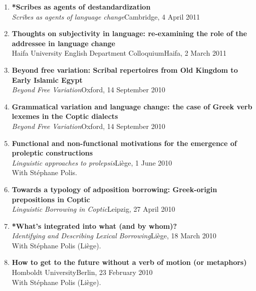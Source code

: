 \documentclass[letterpaper,11pt]{article}
\begin{document}
\begin{enumerate}[resume]
\item \textbf{*Scribes as agents of destandardization}\\\textit{Scribes as agents of language change}\hfill{Cambridge, 4 April 2011}\\

\item \textbf{Thoughts on subjectivity in language: re-examining the role of the addressee in language change}\\
Haifa University English Department Colloquium\hfill{Haifa, 2 March 2011}

\item \textbf{Beyond free variation: Scribal repertoires from Old Kingdom to Early Islamic Egypt}\\\textit{Beyond Free Variation}\hfill{Oxford, 14 September 2010}

\item \textbf{Grammatical variation and language change: the case of Greek verb lexemes in the Coptic dialects}\\
\textit{Beyond Free Variation}\hfill{Oxford, 14 September 2010}

\item \textbf{Functional and non-functional motivations for the emergence of proleptic constructions}\\\textit{Linguistic approaches to prolepsis}\hfill{Li\`{e}ge, 1 June 2010}\\With St\'{e}phane Polis. 


\item \textbf{Towards a typology of adposition borrowing: Greek-origin prepositions in Coptic}\\\textit{Linguistic Borrowing in Coptic}\hfill{Leipzig, 27 April 2010} 

\item \textbf{*What’s integrated into what (and by whom)?}\\
\textit{Identifying and Describing Lexical Borrowing}\hfill{Li\`{e}ge, 18 March 2010}\\With St\'{e}phane Polis (Li\`{e}ge).

\item \textbf{How to get to the future without a verb of motion (or metaphors)}\\Homboldt University\hfill{Berlin, 23 February 2010}\\
With St\'{e}phane Polis (Li\`{e}ge).


\end{enumerate}
\end{document}
